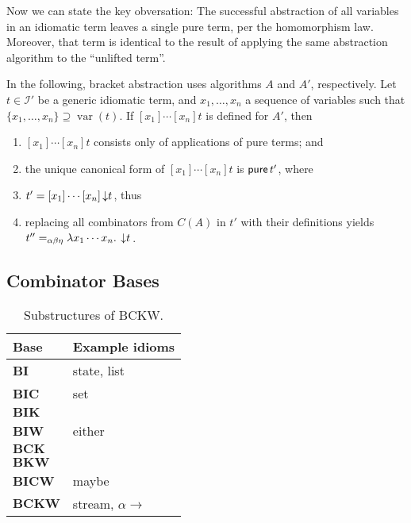 Now we can state the key obversation:
The successful abstraction of all variables in an idiomatic term leaves a
single pure term, per the homomorphism law.
Moreover, that term is identical to the result of applying the same abstraction
algorithm to the ``unlifted term''.

\begin{theorem}
In the following, bracket abstraction uses algorithms $A$ and $A'$, respectively.
Let $t \in \mathcal{I}'$ be a generic idiomatic term, and $x_1,\dots,x_n$
a sequence of variables such that $\{x_1,\dots,x_n\} \supseteq \operatorname{var}(t)$.
If $[x_1]\cdots[x_n]t$ is defined for $A'$, then
\begin{enumerate}
\item $[x_1]\cdots[x_n]t$ consists only of applications of pure terms; and
\item the unique canonical form of $[x_1]\cdots[x_n]t$ is $\operatorname{\mathsf{pure}} t'$, where
\item $t' = [x_1]\cdots[x_n]\left\downarrow t\right.$, thus
\item replacing all combinators from $C(A)$ in $t'$ with their definitions
	yields $t'' =_{\alpha\beta\eta} \lambda x_1\cdots x_n.\>\left\downarrow t\right.$.
\end{enumerate}
\end{theorem}

\subsection{Combinator Bases}\label{subsec:combinator-bases}

\begin{table}\centering
\begin{tabular}{ll}
Base & Example idioms \\
\hline
$\mathbf{BI}$ & state, list \\
$\mathbf{BIC}$ & set \\
$\mathbf{BIK}$ & \\
$\mathbf{BIW}$ & either \\
$\mathbf{BCK}$ & \\
$\mathbf{BKW}$ & \\
$\mathbf{BICW}$ & maybe \\
$\mathbf{BCKW}$ & stream, $\alpha \to$ \\
\end{tabular}
\caption{Substructures of BCKW.}
\label{tab:combinator-bases}
\end{table}

\todo
